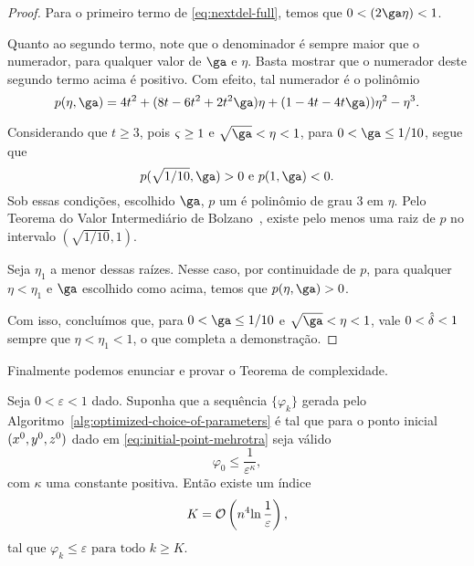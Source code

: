 \begin{proof}
	Para o primeiro termo de \eqref{eq:nextdel-full}, temos que $0 < (2\ga\eta) <1$.

	Quanto ao segundo termo, note que o denominador é  sempre maior que o numerador, para qualquer  valor de $\ga$ e $\eta$. Basta mostrar que  o numerador deste segundo termo acima é positivo. Com efeito, tal numerador é o polinômio 
	\[
		p(\eta,\ga) =  4 t^2 + ( 8t - 6t^2 + 2t^2\ga) \eta + (1 - 4t - 4t   \ga) ) \eta^2 - \eta^3. 
	\]

	Considerando que $t\geq3$, pois $\varsigma\geq1$ e $\sqrt{\ga}<\eta<1$, para $0 < \ga \leq 1/10$, segue que
	\[p(\sqrt{1/10},\ga) >0 \text{ e  } p(1,\ga) <0.\]
	Sob essas condições, escolhido $\ga$,  $p$ um é polinômio de grau 3 em $\eta$. Pelo Teorema do Valor Intermediário de Bolzano~\cite[Teorema 5.3.7]{Bartle:2011tr},  existe pelo menos uma  raiz  de $p$ no intervalo $(\sqrt{1/10},1)$. 

	Seja $\eta_{1}$ a menor dessas raízes. Nesse caso, por continuidade de $p$, para qualquer $\eta  < \eta_{1}$ e $\ga$ escolhido como acima, temos que  $p(\eta,\ga) >0$. 

	Com isso, concluímos que,  para $0 < \ga \leq 1/10$ e  $\sqrt{\ga}<\eta<1$, vale  $0<\hat{\delta}<1$  sempre que $\eta < \eta_{1} < 1$, o que completa a demonstração.
\end{proof}








Finalmente podemos enunciar e provar o Teorema de complexidade. 


\begin{teo}
	\label{teo:alg-convergence-varphi} Seja $0 < \varepsilon <1$ dado. Suponha que a sequência $\{\varphi_{k}\}$ gerada pelo Algoritmo~\ref{alg:optimized-choice-of-parameters} é  tal que 
	para o ponto inicial $(x^0,y^0,z^0)$ dado em \eqref{eq:initial-point-mehrotra} seja válido	
	\begin{equation}
	\label{eq:varphi0-eps-kappa}
		\varphi_{0}\leq \dfrac{1}{\varepsilon^{\kappa}},
	\end{equation} 
	com  $\kappa$ uma constante positiva. Então  existe um índice \[K =  \mathcal{O}\left(n^{4}{\ln\frac{1}{\varepsilon}}\right),\] tal que 
	 $\varphi_{k}\leq \varepsilon \text{ para todo } k \geq K$.
	 
\end{teo}

